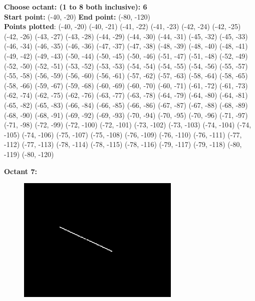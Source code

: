 \documentclass[12pt,letterpaper]{article}
\begin{document}
\textbf{Choose octant: (1 to 8 both inclusive): 6}\\
\textbf{Start point:} (-40, -20)
\textbf{End point:} (-80, -120)\\
\textbf{Points plotted}: 
(-40, -20) (-40, -21) (-41, -22) (-41, -23) 
(-42, -24) (-42, -25) (-42, -26) (-43, -27) 
(-43, -28) (-44, -29) (-44, -30) (-44, -31) 
(-45, -32) (-45, -33) (-46, -34) (-46, -35) 
(-46, -36) (-47, -37) (-47, -38) (-48, -39) 
(-48, -40) (-48, -41) (-49, -42) (-49, -43) 
(-50, -44) (-50, -45) (-50, -46) (-51, -47) 
(-51, -48) (-52, -49) (-52, -50) (-52, -51) 
(-53, -52) (-53, -53) (-54, -54) (-54, -55) 
(-54, -56) (-55, -57) (-55, -58) (-56, -59) 
(-56, -60) (-56, -61) (-57, -62) (-57, -63) 
(-58, -64) (-58, -65) (-58, -66) (-59, -67) 
(-59, -68) (-60, -69) (-60, -70) (-60, -71) 
(-61, -72) (-61, -73) (-62, -74) (-62, -75) 
(-62, -76) (-63, -77) (-63, -78) (-64, -79) 
(-64, -80) (-64, -81) (-65, -82) (-65, -83) 
(-66, -84) (-66, -85) (-66, -86) (-67, -87) 
(-67, -88) (-68, -89) (-68, -90) (-68, -91) 
(-69, -92) (-69, -93) (-70, -94) (-70, -95) 
(-70, -96) (-71, -97) (-71, -98) (-72, -99) 
(-72, -100) (-72, -101) (-73, -102) (-73, -103) 
(-74, -104) (-74, -105) (-74, -106) (-75, -107) 
(-75, -108) (-76, -109) (-76, -110) (-76, -111) 
(-77, -112) (-77, -113) (-78, -114) (-78, -115) 
(-78, -116) (-79, -117) (-79, -118) (-80, -119) 
(-80, -120)


\newpage
\textbf{Octant 7:}
\begin{figure}[h]
    \centering
    \includegraphics[height=6cm]{Outputs/O7-1.png}
\end{figure}
\end{document}
